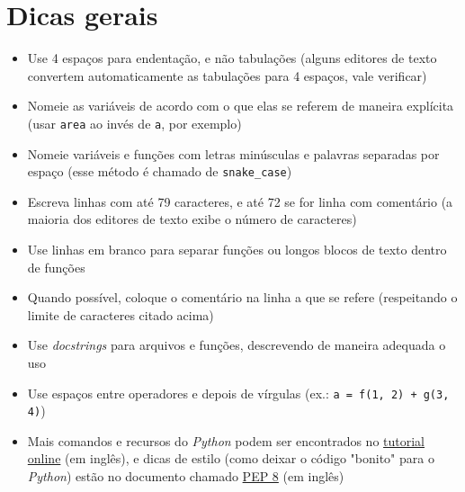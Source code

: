 \section{Dicas gerais}
\begin{itemize}
	\item Use 4 espaços para endentação, e não tabulações (alguns editores de texto convertem automaticamente as tabulações para 4 espaços, vale verificar)
	\item Nomeie as variáveis de acordo com o que elas se referem de maneira explícita (usar \verb|area| ao invés de \verb|a|, por exemplo)
	\item Nomeie variáveis e funções com letras minúsculas e palavras separadas por espaço (esse método é chamado de \verb|snake_case|)
	\item Escreva linhas com até 79 caracteres, e até 72 se for linha com comentário (a maioria dos editores de texto exibe o número de caracteres)
	\item Use linhas em branco para separar funções ou longos blocos de texto dentro de funções
	\item Quando possível, coloque o comentário na linha a que se refere (respeitando o limite de caracteres citado acima)
	\item Use \textit{docstrings} para arquivos e funções, descrevendo de maneira adequada o uso
	\item Use espaços entre operadores e depois de vírgulas (ex.: \verb|a = f(1, 2) + g(3, 4)|)
	\item Mais comandos e recursos do \textit{Python} podem ser encontrados no \href{https://docs.python.org/3/tutorial/index.html}{tutorial online} (em inglês), e dicas de estilo (como deixar o código "bonito" para o \textit{Python}) estão no documento chamado \href{https://www.python.org/dev/peps/pep-0008}{PEP 8} (em inglês)
\end{itemize}
